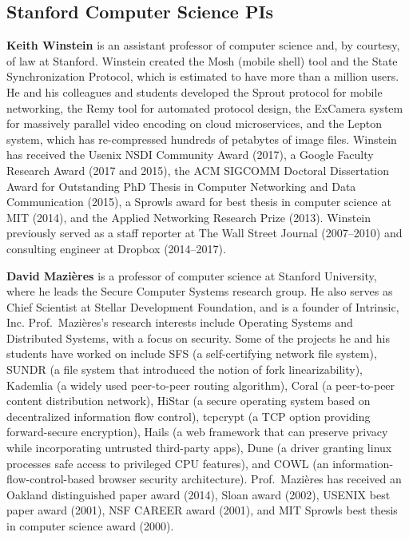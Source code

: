 \documentclass[11pt]{article}
\newcommand{\slim}{\vspace{\baselineskip}}
\begin{document}
\subsection{Stanford Computer Science PIs}

\noindent \textbf{Keith Winstein} is an assistant professor of
computer science and, by courtesy, of law at Stanford. Winstein
created the Mosh (mobile shell) tool and the State Synchronization
Protocol, which is estimated to have more than a million users. He and
his colleagues and students developed the Sprout protocol for mobile
networking, the Remy tool for automated protocol design, the ExCamera
system for massively parallel video encoding on cloud microservices,
and the Lepton system, which has re-compressed hundreds of petabytes
of image files. Winstein has received the Usenix NSDI Community Award
(2017), a Google Faculty Research Award (2017 and 2015), the ACM
SIGCOMM Doctoral Dissertation Award for Outstanding PhD Thesis in
Computer Networking and Data Communication (2015), a Sprowls award for
best thesis in computer science at MIT (2014), and the Applied
Networking Research Prize (2013). Winstein previously served as a
staff reporter at The Wall Street Journal (2007--2010) and consulting
engineer at Dropbox (2014--2017).

\slim

\noindent \textbf{David Mazi\`{e}res} is a professor of computer
science at Stanford University, where he leads the Secure Computer
Systems research group. He also serves as Chief Scientist at Stellar
Development Foundation, and is a founder of Intrinsic,
Inc. Prof.~Mazi\`{e}res's research interests include Operating Systems
and Distributed Systems, with a focus on security. Some of
the projects he and his students have worked on include SFS (a
self-certifying network file system), SUNDR (a file system that
introduced the notion of fork linearizability), Kademlia (a widely
used peer-to-peer routing algorithm), Coral (a peer-to-peer content
distribution network), HiStar (a secure operating system based on
decentralized information flow control), tcpcrypt (a TCP option
providing forward-secure encryption), Hails (a web framework that can
preserve privacy while incorporating untrusted third-party apps), Dune
(a driver granting linux processes safe access to privileged CPU
features), and COWL (an information-flow-control-based browser
security architecture). Prof.~Mazi\`{e}res has received an Oakland distinguished paper award (2014), Sloan award
(2002), USENIX best paper award (2001), NSF CAREER award (2001), and MIT
Sprowls best thesis in computer science award (2000).
\end{document}

